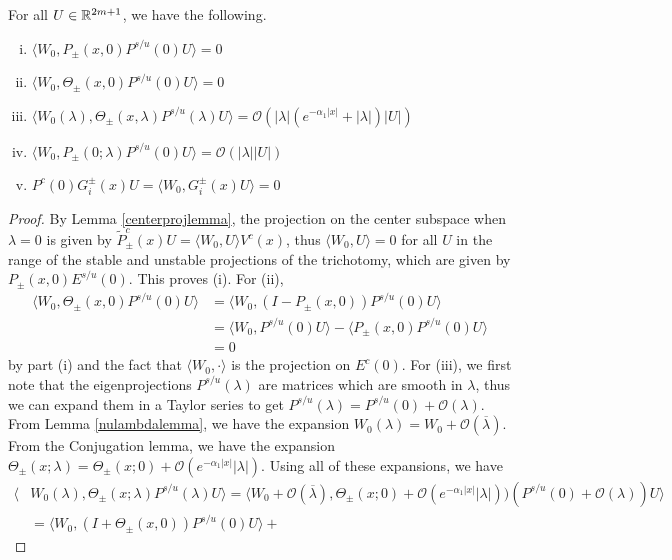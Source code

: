 \documentclass[thesis.tex]{subfiles}
\begin{document}
\begin{lemma}\label{W0projlemma}
For all $U \in \mathbb{R}^{2m+1}$, we have the following.
\begin{enumerate}[(i)]
	\item $\langle W_0, P_\pm(x, 0) P^{s/u}(0) U \rangle = 0$
	\item $\langle W_0, \Theta_\pm(x, 0) P^{s/u}(0) U \rangle = 0$
	\item $\langle W_0(\lambda), \Theta_\pm(x, \lambda) P^{s/u}(\lambda) U \rangle  = \mathcal{O}(|\lambda|( e^{-\alpha_1 |x|} + |\lambda|)|U|)$
	\item $\langle W_0, P_\pm(0; \lambda) P^{s/u}(0) U \rangle = \mathcal{O}(|\lambda||U|)$
	\item $P^c(0) G_i^\pm(x) U = \langle W_0, G_i^\pm(x) U\rangle = 0$
\end{enumerate}
\begin{proof}
By Lemma \ref{centerprojlemma}, the projection on the center subspace when $\lambda = 0$ is given by $\tilde{P}_\pm^c(x)U = \langle W_0, U \rangle V^c(x)$, thus $\langle W_0, U \rangle = 0$ for all $U$ in the range of the stable and unstable projections of the trichotomy, which are given by $P_\pm(x, 0) E^{s/u}(0)$. This proves (i). For (ii), 
\begin{align*}
\langle W_0, \Theta_\pm(x, 0) P^{s/u}(0) U\rangle &=
\langle W_0, (I - P_\pm(x, 0)) P^{s/u}(0) U\rangle \\
&= \langle W_0, P^{s/u}(0) U \rangle - \langle P_\pm(x, 0)P^{s/u}(0) U \rangle \\
&= 0
\end{align*}
by part (i) and the fact that $\langle W_0, \cdot \rangle$ is the projection on $E^c(0)$. For (iii), we first note that the eigenprojections $P^{s/u}(\lambda)$ are matrices which are smooth in $\lambda$, thus we can expand them in a Taylor series to get $P^{s/u}(\lambda) = P^{s/u}(0) + \mathcal{O}(\lambda)$. From Lemma \ref{nulambdalemma}, we have the expansion $W_0(\lambda) = W_0 + \mathcal{O}(\overline{\lambda})$. From the Conjugation lemma, we have the expansion $\Theta_\pm(x; \lambda) = \Theta_\pm(x; 0) + \mathcal{O}(e^{-\alpha_1 |x|}|\lambda|)$. Using all of these expansions, we have
\begin{align*}
\langle &W_0(\lambda), \Theta_\pm(x; \lambda) P^{s/u}(\lambda) U \rangle = \langle W_0 + \mathcal{O}(\overline{\lambda}), \Theta_\pm(x; 0) + \mathcal{O}(e^{-\alpha_1 |x|}|\lambda|))(P^{s/u}(0) + \mathcal{O}(\lambda)) U \rangle \\
&= \langle W_0, (I + \Theta_\pm(x, 0))P^{s/u}(0)U \rangle +

\end{align*}
\end{proof}
\end{lemma}
\end{document}
